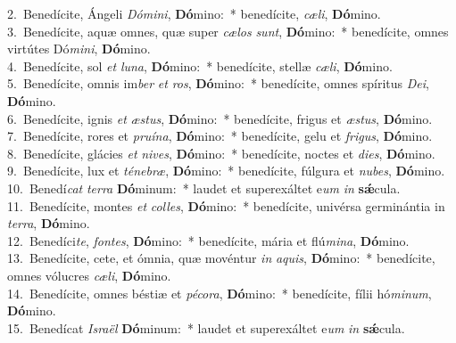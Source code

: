 {2.~}Benedícite, Ángeli \textit{Dó}\textit{mi}\textit{ni}, \textbf{Dó}mino:~* benedícite, \textit{cæ}\textit{li}, \textbf{Dó}mino.\\
{3.~}Benedícite, aquæ omnes, quæ super \textit{cæ}\textit{los} \textit{sunt}, \textbf{Dó}mino:~* benedícite, omnes virtútes Dó\textit{mi}\textit{ni}, \textbf{Dó}mino.\\
{4.~}Benedícite, sol \textit{et} \textit{lu}\textit{na}, \textbf{Dó}mino:~* benedícite, stellæ \textit{cæ}\textit{li}, \textbf{Dó}mino.\\
{5.~}Benedícite, omnis im\textit{ber} \textit{et} \textit{ros}, \textbf{Dó}mino:~* benedícite, omnes spíritus \textit{De}\textit{i}, \textbf{Dó}mino.\\
{6.~}Benedícite, ignis \textit{et} \textit{æ}\textit{stus}, \textbf{Dó}mino:~* benedícite, frigus et \textit{æ}\textit{stus}, \textbf{Dó}mino.\\
{7.~}Benedícite, rores et \textit{pru}\textit{í}\textit{na}, \textbf{Dó}mino:~* benedícite, gelu et \textit{fri}\textit{gus}, \textbf{Dó}mino.\\
{8.~}Benedícite, glácies \textit{et} \textit{ni}\textit{ves}, \textbf{Dó}mino:~* benedícite, noctes et \textit{di}\textit{es}, \textbf{Dó}mino.\\
{9.~}Benedícite, lux et \textit{té}\textit{ne}\textit{bræ}, \textbf{Dó}mino:~* benedícite, fúlgura et \textit{nu}\textit{bes}, \textbf{Dó}mino.\\
{10.~}Benedí\textit{cat} \textit{ter}\textit{ra} \textbf{Dó}minum:~* laudet et superexáltet e\textit{um} \textit{in} \textbf{sǽ}cula.\\
{11.~}Benedícite, montes \textit{et} \textit{col}\textit{les}, \textbf{Dó}mino:~* benedícite, univérsa germinántia in \textit{ter}\textit{ra}, \textbf{Dó}mino.\\
{12.~}Benedíci\textit{te}, \textit{fon}\textit{tes}, \textbf{Dó}mino:~* benedícite, mária et flú\textit{mi}\textit{na}, \textbf{Dó}mino.\\
{13.~}Benedícite, cete, et ómnia, quæ movéntur \textit{in} \textit{a}\textit{quis}, \textbf{Dó}mino:~* benedícite, omnes vólucres \textit{cæ}\textit{li}, \textbf{Dó}mino.\\
{14.~}Benedícite, omnes béstiæ et \textit{pé}\textit{co}\textit{ra}, \textbf{Dó}mino:~* benedícite, fílii hó\textit{mi}\textit{num}, \textbf{Dó}mino.\\
{15.~}Benedícat \textit{Is}\textit{ra}\textit{ël} \textbf{Dó}minum:~* laudet et superexáltet e\textit{um} \textit{in} \textbf{sǽ}cula.\\
